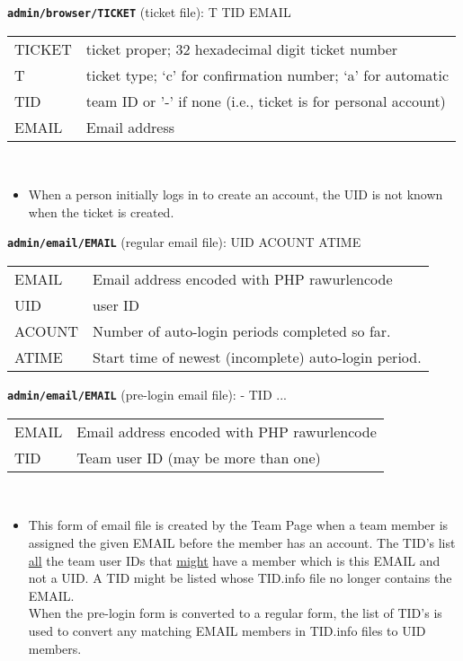 \documentclass[12pt]{article}
\newenvironment{indpar}[1][0.4in]%
	{\begin{list}{}%
		     {\setlength{\itemsep}{0in}%
		      \setlength{\topsep}{0in}%
		      \setlength{\parsep}{1ex}%
		      \setlength{\labelwidth}{#1}%
		      \setlength{\leftmargin}{#1}%
		      \addtolength{\leftmargin}{\labelsep}}%
	 \item}%
	{\end{list}}
\newenvironment{itemlist}[1][0.2in]%
	{\begin{list}{}{\setlength{\labelwidth}{#1}%
		        \setlength{\leftmargin}{\labelwidth}%
		        \addtolength{\leftmargin}{+0.2in}%
		        \addtolength{\linewidth}{-\labelwidth}%
		        \addtolength{\linewidth}{-0.2in}%
		        \renewcommand{\makelabel}[1]{##1\hfill}}
	 \raggedright}%
	{\end{list}}
\newcommand{\TT}[1]{{\tt \bfseries #1}}
\begin{document}
\begin{indpar}
\begin{itemlist}
\item[\TT{admin/browser/TICKET} (ticket file):] T TID EMAIL
\label{ADMIN/TICKET/TICKET} \\
\begin{tabular}[t]{lp{4.0in}}
TICKET & ticket proper; 32 hexadecimal digit ticket number \\
T & ticket type; `c' for confirmation number; `a' for automatic \\
TID & team ID or '-' if none (i.e., ticket is for personal account) \\
EMAIL & Email address \\
\end{tabular}
\\
\begin{itemize}
\item When a person initially logs in to create an account,
the UID is not known when the ticket is created.
\end{itemize}

\item[\TT{admin/email/EMAIL} (regular email file):] UID ACOUNT ATIME
\label{ADMIN/EMAIL/EMAIL} \\
\begin{tabular}[t]{lp{4.0in}}
EMAIL & Email address encoded with PHP rawurlencode \\
UID & user ID \\
ACOUNT & Number of auto-login periods completed so far. \\
ATIME & Start time of newest (incomplete) auto-login period. \\
\end{tabular}

\item[\TT{admin/email/EMAIL} (pre-login email file):] - TID ...
\label{ADMIN/EMAIL/EMAIL-ALTERNATE} \\
\begin{tabular}[t]{lp{4.0in}}
EMAIL & Email address encoded with PHP rawurlencode \\
TID & Team user ID (may be more than one) \\
\end{tabular}
\\
\begin{itemize}
\item This form of email file is created by the Team Page when
a team member is assigned the given EMAIL before the member
has an account.  The TID's list \underline{all} the team user IDs that
\underline{might} have a member which is this EMAIL and not a UID.
A TID might be listed whose
TID.info file no longer contains the EMAIL.
\\[1ex]
When the pre-login form is converted to a regular form,
the list of TID's is used to convert any matching EMAIL members
in TID.info files to UID members.
\end{itemize}


\end{itemlist}
\end{indpar}
\end{document}
